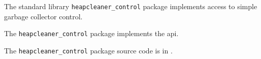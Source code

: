 
The standard library {\tt heapcleaner\_control} package implements access to simple garbage collector control.

The {\tt heapcleaner\_control} package implements the  api.

The {\tt heapcleaner\_control} package source code is in .
